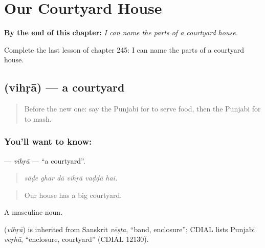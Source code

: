 
\chapter{Our Courtyard House}
\label{ch:pa-a2-our-courtyard-house}

\begin{chapteropening}
\textbf{By the end of this chapter:} \emph{I can name the parts of a courtyard house.}

Complete the last lesson of chapter 245: I can name the parts of a courtyard house.
\end{chapteropening}

\section[\texorpdfstring{\pa{ਵਿਹੜਾ} (vihṛā)}{ਵਿਹੜਾ (vihṛā)}]{ (vihṛā) — a courtyard}

\label{lesson:PA-C245-vihra}



\begin{quote}
Before the new one: say the Punjabi for to serve food, then the Punjabi for to mash.
\end{quote}

\subsection*{You'll want to know: }
\textbf{} — \emph{vihṛā} — \textquotedblleft{}a courtyard\textquotedblright{}.

\begin{quote}
     
\end{quote}

\begin{quote}
\emph{sāḍe ghar dā vihṛā vaḍḍā hai.}
\end{quote}

\begin{quote}
Our house has a big courtyard.
\end{quote}

A masculine noun.

\begin{cousinweb}
\textbf{} (\emph{vihṛā}) is inherited from Sanskrit \emph{vēṣṭa}, \textquotedblleft{}band, enclosure\textquotedblright{}; CDIAL lists Punjabi \emph{veṛhā}, \textquotedblleft{}enclosure, courtyard\textquotedblright{} (CDIAL 12130).
\end{cousinweb}

